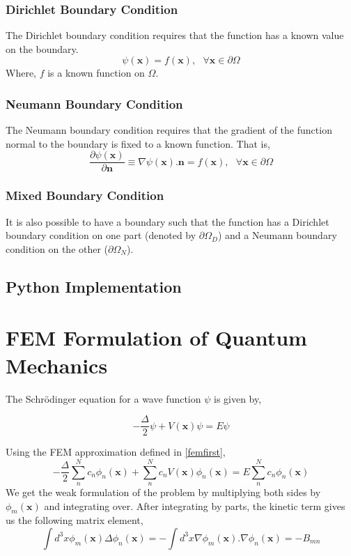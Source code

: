 \documentclass[a4paper,10pt]{report}
\begin{document}
\subsubsection{Dirichlet Boundary Condition}
The Dirichlet boundary condition requires that the function has a known value on the boundary.
\begin{equation}\label{dirichlet1}
 \psi(\mathbf{x})=f(\mathbf{x}), \mbox{ }\forall\mathbf{x}\in \partial\Omega
\end{equation}
Where, $f$ is a known function on $\Omega$.

\subsubsection{Neumann Boundary Condition}
The Neumann boundary condition requires that the gradient of the function
normal to the boundary is fixed to a known function. That is,
\begin{equation}\label{neumann1}
 \frac{\partial\psi(\mathbf{x})}{\partial\mathbf{n}}\equiv\nabla\psi(\mathbf{x}).\mathbf{n} = f(\mathbf{x}), \mbox{ }\forall\mathbf{x}\in \partial\Omega
\end{equation}

\subsubsection{Mixed Boundary Condition}
It is also possible to have a boundary such that the function has a Dirichlet boundary
condition on one part (denoted by $\partial\Omega_D$) and a Neumann boundary condition
on the other ($\partial\Omega_N$).

\subsection{Python Implementation}
\section{FEM Formulation of Quantum Mechanics}
The Schrödinger equation for a wave function $\psi$ is given by,

\begin{equation}\label{schroedinger1}
 -\frac{\Delta}{2}\psi+V(\mathbf{x})\psi=E\psi
\end{equation}

\noindent Using the FEM approximation defined in \eqref{femfirst},
\begin{equation}\label{schroedinger}
 -\frac{\Delta}{2}\displaystyle\sum_n^N c_n\phi_n(\mathbf{x})+\displaystyle\sum_n^N c_n V(\mathbf{x})\phi_n(\mathbf{x})=E\displaystyle\sum_n^N c_n\phi_n(\mathbf{x})
\end{equation}
\noindent We get the weak formulation of the problem by multiplying both sides by $\phi_m(\mathbf{x})$ and integrating over. After integrating by parts, the kinetic term gives us
the following matrix element,
\begin{equation}\label{kineticterm}
 \int d^3x\phi_m(\mathbf{x})\Delta\phi_n(\mathbf{x}) = -\int d^3x\nabla\phi_m(\mathbf{x}).\nabla\phi_n(\mathbf{x}) = -B_{mn}
\end{equation}
\end{document}
